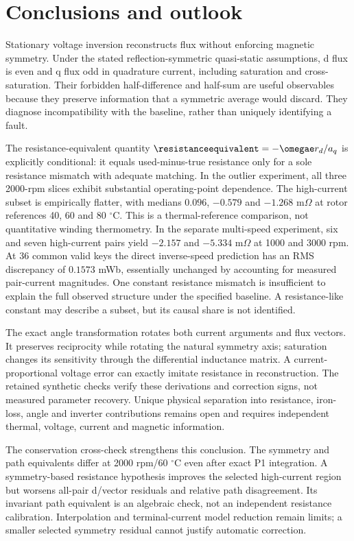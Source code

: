 \section{Conclusions and outlook}
Stationary voltage inversion reconstructs flux without enforcing magnetic
symmetry. Under the stated reflection-symmetric quasi-static assumptions,
d flux is even and q flux odd in quadrature current, including saturation and
cross-saturation. Their forbidden half-difference and half-sum are useful
observables because they preserve information that a symmetric average
would discard. They diagnose incompatibility with the baseline, rather than
uniquely identifying a fault.

The resistance-equivalent quantity $\resistanceequivalent=-\omegae r_d/a_q$
is explicitly conditional: it equals used-minus-true resistance only for a
sole resistance mismatch with adequate matching. In the outlier experiment,
all three 2000-rpm slices exhibit substantial operating-point dependence.
The high-current subset is empirically flatter, with medians $0.096$,
$-0.579$ and $-1.268$ m$\Omega$ at rotor references 40, 60 and 80 $^\circ$C.
This is a thermal-reference comparison, not quantitative winding thermometry.
In the separate multi-speed experiment, six and seven high-current pairs
yield $-2.157$ and $-5.334$ m$\Omega$ at 1000 and 3000 rpm. At 36 common
valid keys the direct inverse-speed prediction has an RMS discrepancy of
$0.1573$ mWb, essentially unchanged by accounting for measured pair-current
magnitudes. One constant resistance mismatch is insufficient to explain the
full observed structure under the specified baseline. A resistance-like
constant may describe a subset, but its causal share is not identified.

The exact angle transformation rotates both current arguments and flux
vectors. It preserves reciprocity while rotating the natural symmetry axis;
saturation changes its sensitivity through the differential inductance
matrix. A current-proportional voltage error can exactly imitate resistance
in reconstruction. The retained synthetic checks verify these derivations
and correction signs, not measured parameter recovery. Unique physical
separation into resistance, iron-loss, angle and inverter contributions
remains open and requires independent thermal, voltage, current and magnetic
information.

The conservation cross-check strengthens this conclusion. The symmetry and
path equivalents differ at 2000 rpm/60 $^\circ$C even after exact P1
integration. A symmetry-based resistance hypothesis improves the selected
high-current region but worsens all-pair d/vector residuals and relative
path disagreement. Its invariant path equivalent is an algebraic check,
not an independent resistance calibration. Interpolation and terminal-current
model reduction remain limits; a smaller selected symmetry residual cannot
justify automatic correction.

